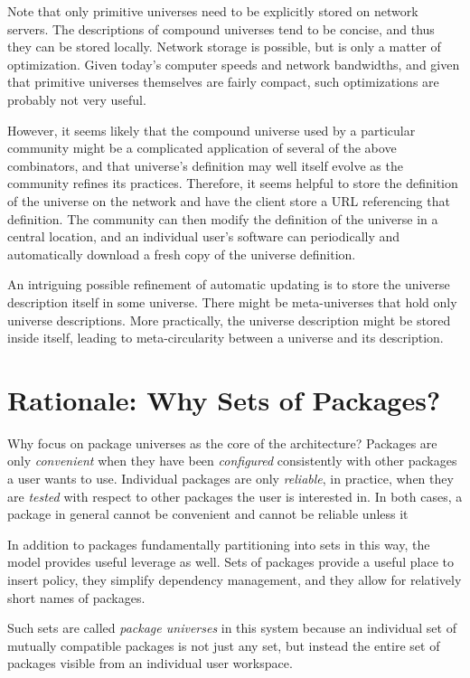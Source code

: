 \documentclass{IEEEtran}
\begin{document}
Note that only primitive universes need to be explicitly stored on
network servers.  The descriptions of compound universes tend to be
concise, and thus they can be stored locally.  Network storage is
possible, but is only a matter of optimization.  Given today's
computer speeds and network bandwidths, and given that primitive
universes themselves are fairly compact, such optimizations are
probably not very useful.


However, it seems likely that the compound universe used by a
particular community might be a complicated application of several of
the above combinators, and that universe's definition may well itself
evolve as the community refines its practices.  Therefore, it seems
helpful to store the definition of the universe on the network and
have the client store a URL referencing that definition.  The
community can then modify the definition of the universe in a central
location, and an individual user's software can periodically and
automatically download a fresh copy of the universe definition.

An intriguing possible refinement of automatic updating is to store
the universe description itself in some universe.  There might be
meta-universes that hold only universe descriptions.  More
practically, the universe description might be stored inside itself,
leading to meta-circularity between a universe and its description.



\section{Rationale: Why Sets of Packages?}

Why focus on package universes as the core of the architecture?
Packages are only \emph{convenient} when they have been
\emph{configured} consistently with other packages a user wants to
use.  Individual packages are only \emph{reliable}, in practice, when
they are \emph{tested} with respect to other packages the user is
interested in.  In both cases, a package in general cannot be
convenient and cannot be reliable unless it 

In addition to packages fundamentally partitioning into sets in this
way, the model provides useful leverage as well.  Sets of packages
provide a useful place to insert policy, they simplify dependency
management, and they allow for relatively short names of packages.

Such sets are called \emph{package universes} in this system because
an individual set of mutually compatible packages is not just any set,
but instead the entire set of packages visible from an individual user
workspace.
\end{document}
